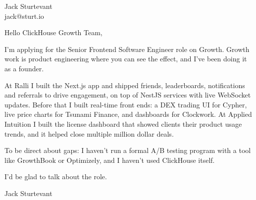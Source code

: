 \documentclass[11pt]{article}
\begin{document}
\raggedright

{\namefont\fontsize{20pt}{24pt}\selectfont Jack Sturtevant}\\[-0.3em]
jack@sturt.io

\vspace{1.2em}

Hello ClickHouse Growth Team,

I'm applying for the Senior Frontend Software Engineer role on Growth. Growth work is product engineering where you can see the effect, and I've been doing it as a founder.

At Ralli I built the Next.js app and shipped friends, leaderboards, notifications and referrals to drive engagement, on top of NestJS services with live WebSocket updates. Before that I built real-time front ends: a DEX trading UI for Cypher, live price charts for Tsunami Finance, and dashboards for Clockwork. At Applied Intuition I built the license dashboard that showed clients their product usage trends, and it helped close multiple million dollar deals.

To be direct about gaps: I haven't run a formal A/B testing program with a tool like GrowthBook or Optimizely, and I haven't used ClickHouse itself.

I'd be glad to talk about the role.

\vspace{0.6em}
Jack Sturtevant
\end{document}

